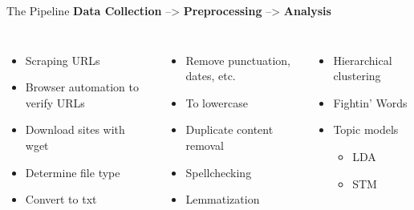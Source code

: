\documentclass[12pt]{beamer}
\begin{document}
\begin{frame}{The Pipeline}
	\textbf{Data Collection} \hspace{2mm} --> \hspace{2mm} \textbf{Preprocessing} \hspace{2mm} --> \hspace{2mm} \textbf{Analysis}
\begin{columns}
	\vspace{5mm}
	\begin{itemize}
		\item Scraping URLs
		\item Browser automation to verify URLs
		\item Download sites with wget
		\item Determine file type
		\item Convert to txt
	\end{itemize}		
	\vspace{5mm}
	\begin{itemize}
		\item Remove punctuation, dates, etc.
		\item To lowercase
		\item Duplicate content removal
		\item Spellchecking
		\item Lemmatization
	\end{itemize}
	\vspace{5mm}
	\begin{itemize}
		\item Hierarchical clustering
		\item Fightin' Words
		\item Topic models
		\begin{itemize}
			\item LDA
			\item STM
		\end{itemize}
	\end{itemize}
\end{columns}
\end{frame}
\end{document}
